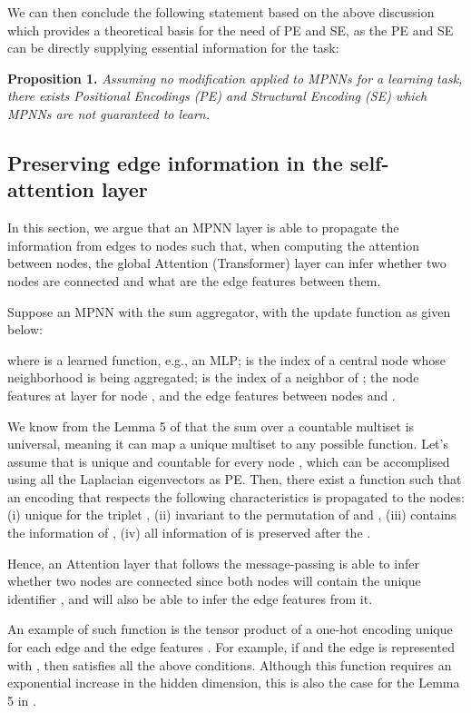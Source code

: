 \documentclass{article}
\begin{document}
We can then conclude the following statement based on the above discussion which provides a theoretical basis for the need of PE and SE, as the PE and SE can be directly supplying essential information for the task:

\textbf{Proposition 1.} \textit{Assuming no modification applied to MPNNs for a learning task, there exists Positional Encodings (PE) and Structural Encoding (SE) which MPNNs are not guaranteed to learn.}

\newpage
\subsection{Preserving edge information in the self-attention layer}
\label{app:edge-in-attention}

In this section, we argue that an MPNN layer is able to propagate the information from edges to nodes such that, when computing the attention between nodes, the global Attention (Transformer) layer can infer whether two nodes are connected and what are the edge features between them.

Suppose an MPNN with the sum aggregator, with the update function as given below:

where  is a learned function, e.g., an MLP;  is the index of a central node whose neighborhood is being aggregated;  is the index of a neighbor of ;  the node features at layer  for node , and  the edge features between nodes  and .

We know from the Lemma 5 of \citet{xu2018how} that the sum over a countable multiset is universal, meaning it can map a unique multiset to any possible function. Let's assume that  is unique and countable for every node , which can be accomplised using all the Laplacian eigenvectors as PE. Then, there exist a function  such that an encoding  that respects the following characteristics is propagated to the nodes: (i) unique for the triplet , (ii) invariant to the permutation of  and , (iii) contains the information of , (iv) all information of  is preserved after the .

Hence, an Attention layer that follows the message-passing is able to infer whether two nodes are connected since both nodes will contain the unique identifier , and will also be able to infer the edge features from it.

An example of such function  is the tensor product  of a one-hot encoding unique for each edge  and the edge features . For example, if  and the edge is represented with , then  satisfies all the above conditions. Although this function requires an exponential increase in the hidden dimension, this is also the case for the Lemma 5 in \citet{xu2018how}.
\end{document}
